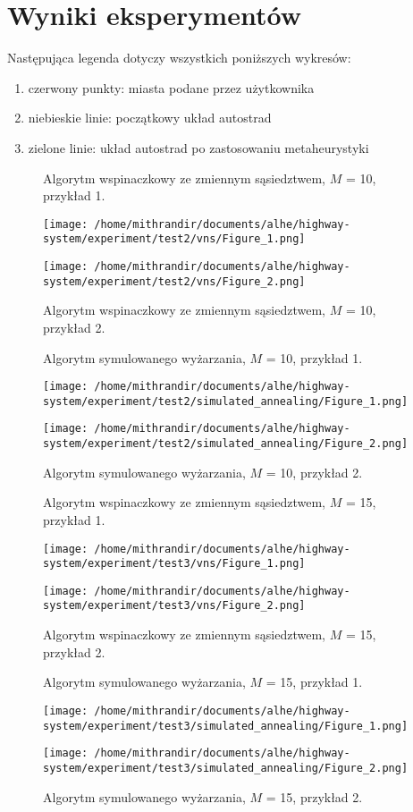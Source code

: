 \documentclass{article}
\begin{document}
\section{Wyniki eksperymentów}
Następująca legenda dotyczy wszystkich poniższych wykresów:
\begin{enumerate}
	\item czerwony punkty: miasta podane przez użytkownika
	\item niebieskie linie: początkowy układ autostrad
	\item zielone linie: układ autostrad po zastosowaniu metaheurystyki
\end{enumerate}

\begin{figure}[h]
	\caption{Algorytm wspinaczkowy ze zmiennym sąsiedztwem, $M$ = 10, przykład 1.}
	\texttt{[image: /home/mithrandir/documents/alhe/highway-system/experiment/test2/vns/Figure\_1.png]}
	
	\caption{Algorytm wspinaczkowy ze zmiennym sąsiedztwem, $M$ = 10, przykład 2.}
	\texttt{[image: /home/mithrandir/documents/alhe/highway-system/experiment/test2/vns/Figure\_2.png]}
\end{figure}

\begin{figure}[h]
	\caption{Algorytm symulowanego wyżarzania, $M$ = 10, przykład 1.}
	\texttt{[image: /home/mithrandir/documents/alhe/highway-system/experiment/test2/simulated\_annealing/Figure\_1.png]}
	
	\caption{Algorytm symulowanego wyżarzania, $M$ = 10, przykład 2.}
	\texttt{[image: /home/mithrandir/documents/alhe/highway-system/experiment/test2/simulated\_annealing/Figure\_2.png]}
\end{figure}

\begin{figure}[h]
	\caption{Algorytm wspinaczkowy ze zmiennym sąsiedztwem, $M$ = 15, przykład 1.}
	\texttt{[image: /home/mithrandir/documents/alhe/highway-system/experiment/test3/vns/Figure\_1.png]}
	
	\caption{Algorytm wspinaczkowy ze zmiennym sąsiedztwem, $M$ = 15, przykład 2.}
	\texttt{[image: /home/mithrandir/documents/alhe/highway-system/experiment/test3/vns/Figure\_2.png]}
\end{figure}

\begin{figure}[h]
	\caption{Algorytm symulowanego wyżarzania, $M$ = 15, przykład 1.}
	\texttt{[image: /home/mithrandir/documents/alhe/highway-system/experiment/test3/simulated\_annealing/Figure\_1.png]}
	
	\caption{Algorytm symulowanego wyżarzania, $M$ = 15, przykład 2.}
	\texttt{[image: /home/mithrandir/documents/alhe/highway-system/experiment/test3/simulated\_annealing/Figure\_2.png]}
\end{figure}
\end{document}
